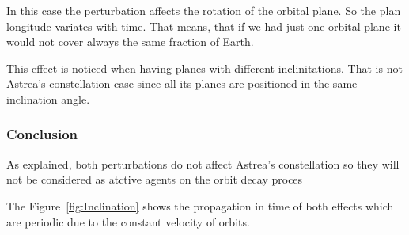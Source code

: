 In this case the perturbation affects the rotation of the orbital plane. So the plan longitude variates with time. That means, that if we had just one orbital plane it would not cover always the same fraction of Earth.

This effect is noticed when having planes with different inclinitations. That is not Astrea's constellation case since all its planes are positioned in the same inclination angle.

\subsubsection{Conclusion}

As explained, both perturbations do not affect Astrea's constellation so they will not be considered as atctive agents on the orbit decay proces

The Figure~\ref{fig:Inclination} shows the propagation in time of both effects which are periodic due to the constant velocity  of orbits.